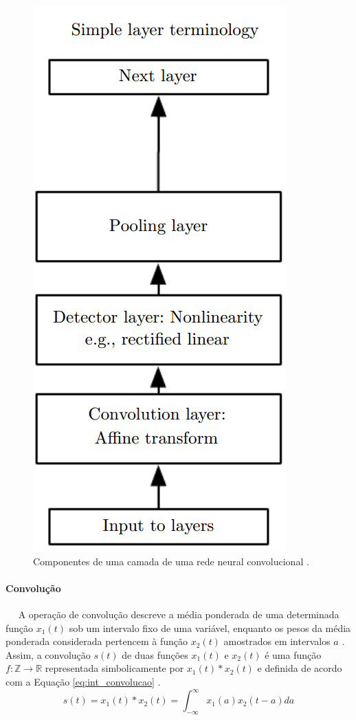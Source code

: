 \begin{figure}
	\centering
	\includegraphics[height=0.3\textheight]{img/cnn_camada.png}
	\caption{Componentes de uma camada de uma rede neural convolucional \cite{goodfellow2016deep}. }
	\label{fig:cnn_camada}
\end{figure}


\paragraph{Convolução}
\ \ \newline
A operação de convolução descreve a média ponderada de uma determinada função $x_1(t)$ sob um intervalo fixo de uma variável, enquanto os pesos da média ponderada considerada pertencem à função $x_2(t)$ amostrados em intervalos $a$ \cite{bracewell1986fourier}. Assim, a convolução $s(t)$ de duas funções $x_1(t)$ e $x_2(t)$ é uma função $f: \mathds{Z} \rightarrow \mathds{R}$ representada simbolicamente por $x_1(t) * x_2(t)$ e definida de acordo com a Equação \ref{eq:int_convolucao} \cite{lathi2006sinais}.
\begin{equation}\label{eq:int_convolucao}
	s(t) = x_1(t) * x_2(t) = \int_{-\infty}^{\infty} x_1(a) x_2(t-a)da
\end{equation}

